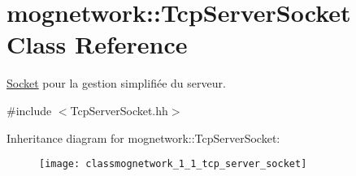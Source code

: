 \hypertarget{classmognetwork_1_1_tcp_server_socket}{\section{mognetwork\-:\-:Tcp\-Server\-Socket Class Reference}
\label{classmognetwork_1_1_tcp_server_socket}
}


\hyperlink{classmognetwork_1_1_socket}{Socket} pour la gestion simplifiée du serveur.  




{\ttfamily \#include $<$Tcp\-Server\-Socket.\-hh$>$}

Inheritance diagram for mognetwork\-:\-:Tcp\-Server\-Socket\-:\begin{figure}[H]
\begin{center}
\leavevmode
\texttt{[image: classmognetwork\_1\_1\_tcp\_server\_socket]}
\end{center}
\end{figure}

